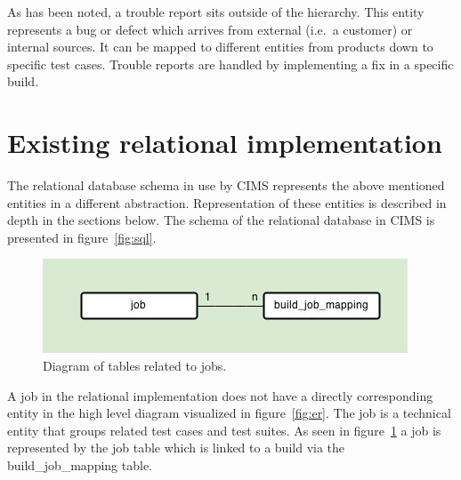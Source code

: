 As has been noted, a trouble report sits outside of the hierarchy. This entity represents a bug or defect which arrives from external (i.e.\ a customer) or internal sources. It can be mapped to different entities from products down to specific test cases. Trouble reports are handled by implementing a fix in a specific build.

\section{Existing relational implementation}
The relational database schema in use by CIMS represents the above mentioned entities in a different abstraction. Representation of these entities is described in depth in the sections below. 
The schema of the relational database in CIMS is presented in figure~\ref{fig:sql}.
\begin{figure}[h!]
\centering
\includegraphics[scale=0.5]{figure/job.jpg}
\caption{Diagram of tables related to jobs.}
\label{fig:job}
\end{figure}
A job in the relational implementation does not have a directly corresponding entity in the high level diagram visualized in figure~\ref{fig:er}. The job is a technical entity that groups related test cases and test suites. As seen in figure~\ref{fig:job} a job is represented by the job table which is linked to a build via the build\_job\_mapping table. 

